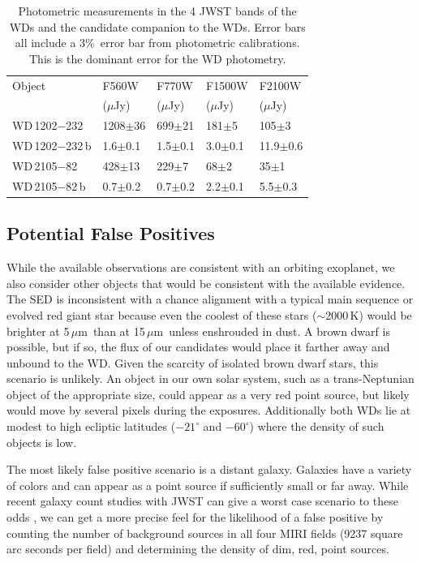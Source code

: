 \documentclass[twocolumn]{aastex631}
\newcommand{\um}{\,$\mu$m}
\newcommand{\wdA}{WD\,1202$-$232}
\newcommand{\wdB}{WD\,2105$-$82}
\begin{document}
\begin{table}
    \centering
    \begin{tabular}{l|llll}
    \hline
    \hline
    Object & F560W & F770W & F1500W & F2100W \\
       & ($\mu$Jy)   & ($\mu$Jy) & ($\mu$Jy) & ($\mu$Jy) \\
     \hline
    \wdA\ & 1208$\pm$36&699$\pm$21 &181$\pm$5 & 105$\pm$3 \\
    \wdA\,b & 1.6$\pm$0.1 &1.5$\pm$0.1 & 3.0$\pm$0.1 & 11.9$\pm$0.6\\
    \wdB\ &428$\pm$13 &229$\pm$7 & 68$\pm$2 & 35$\pm$1\\
    \wdB\,b & 0.7$\pm$0.2&0.7$\pm$0.2 & 2.2$\pm$0.1 & 5.5$\pm$0.3\\
    \end{tabular}
    \caption{Photometric measurements in the 4 JWST bands of the WDs and the candidate companion to the WDs. Error bars all include a 3\%\ error bar from photometric calibrations. This is the dominant error for the WD photometry.}
    \label{tab:phot}
\end{table}

\subsection{Potential False Positives}
While the available observations are consistent with an orbiting exoplanet, we also consider other objects that would be consistent with the available evidence.  The SED is inconsistent with a chance alignment with a typical main sequence or evolved red giant star because even the coolest of these stars ($\sim$2000\,K) would be brighter at 5\um\ than at 15\um\, \citep{phoenix2013} unless enshrouded in dust. A brown dwarf is possible, but if so, the flux of our candidates would place it farther away and unbound to the WD. Given the scarcity of isolated brown dwarf stars, this scenario is unlikely. An object in our own solar system, such as a trans-Neptunian object of the appropriate size, could appear as a very red point source, but likely would move by several pixels during the exposures. Additionally both WDs lie at modest to high ecliptic latitudes ($-21^{\circ}$ and $-60^{\circ}$) where the density of such objects is low.

The most likely false positive scenario is a distant galaxy. Galaxies have a variety of colors and can appear as a point source if sufficiently small or far away. While recent galaxy count studies with JWST can give a worst case scenario to these odds \citep{Ling2022, WuCossas23}, we can get a more precise feel for the likelihood of a false positive by counting the number of background sources in all four MIRI fields (9237 square arc seconds per field) and determining the density of dim, red, point sources.
\end{document}

